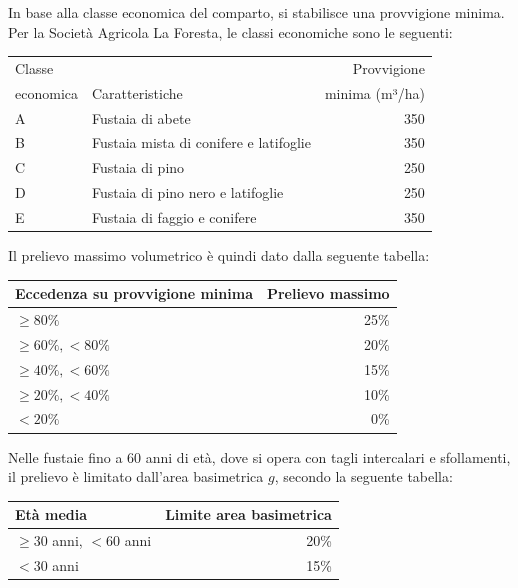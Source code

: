 \documentclass[a4paper,11pt]{article}
\begin{document}
In base alla classe economica del comparto, si stabilisce una provvigione minima. Per la Società Agricola La Foresta, le classi economiche sono le seguenti:

\begin{center}
    \small
    \begin{tabular}{llr}
    \hline
    Classe           &                                          & Provvigione \\
    economica        & Caratteristiche                          & minima (m³/ha)\\
    \hline
    A                & Fustaia di abete                         & 350 \\
    B                & Fustaia mista di conifere e latifoglie   & 350 \\
    C                & Fustaia di pino                          & 250 \\
    D                & Fustaia di pino nero e latifoglie        & 250 \\
    E                & Fustaia di faggio e conifere             & 350 \\
    \hline
    \end{tabular}
\end{center}

Il prelievo massimo volumetrico è quindi dato dalla seguente tabella:

\begin{center}
    \small
    \begin{tabular}{lr}
    \hline
    Eccedenza su provvigione minima         & Prelievo massimo \\
    \hline
    $\ge 80\%$                              & 25\% \\
    $\ge 60\%, < 80\%$                      & 20\% \\
    $\ge 40\%, < 60\%$                      & 15\% \\
    $\ge 20\%, < 40\%$                      & 10\% \\
    $< 20\%$                                &  0\% \\
    \hline
    \end{tabular}
\end{center}

Nelle fustaie fino a 60 anni di età, dove si opera con tagli intercalari e
sfollamenti, il prelievo è limitato dall'area basimetrica $g$, secondo la
seguente tabella:

\begin{center}
    \small
    \begin{tabular}{lr}
    \hline
    Età media                   & Limite area basimetrica \\
    \hline
    $\ge 30$ anni, $< 60$ anni  & 20\% \\
    $<30$ anni                  & 15\% \\
    \hline
    \end{tabular}
\end{center}
\end{document}

